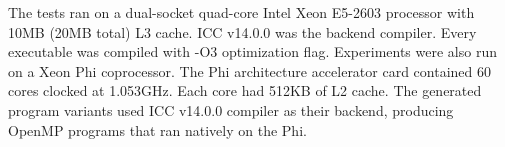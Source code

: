 The tests ran on a dual-socket quad-core Intel Xeon E5-2603 processor with 10MB (20MB total) L3 cache.
ICC v14.0.0 was the backend compiler. Every executable was compiled with -O3 optimization flag. 
Experiments were also run on a Xeon Phi coprocessor. 
The Phi architecture accelerator card contained 60 cores clocked at 1.053GHz. Each core had 512KB of L2 cache. 
The generated program variants used ICC v14.0.0 compiler as their backend, producing OpenMP programs that ran natively on the Phi.
